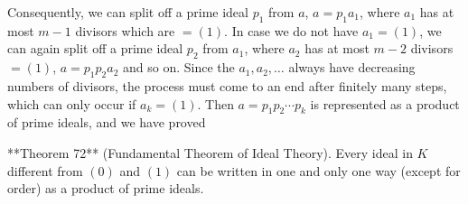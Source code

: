 Consequently, we can split off a prime ideal $p_1$ from $a$, $a = p_1a_1$, where $a_1$ has at most $m - 1$ divisors which are $= (1)$. In case we do not have $a_1 = (1)$, we can again split off a prime ideal $p_2$ from $a_1$, where $a_2$ has at most $m - 2$ divisors $= (1)$, $a = p_1p_2a_2$ and so on. Since the $a_1, a_2, \ldots$ always have decreasing numbers of divisors, the process must come to an end after finitely many steps, which can only occur if $a_k = (1)$. Then $a = p_1p_2 \cdots p_k$ is represented as a product of prime ideals, and we have proved

**Theorem 72** (Fundamental Theorem of Ideal Theory). Every ideal in $K$ different from $(0)$ and $(1)$ can be written in one and only one way (except for order) as a product of prime ideals.

